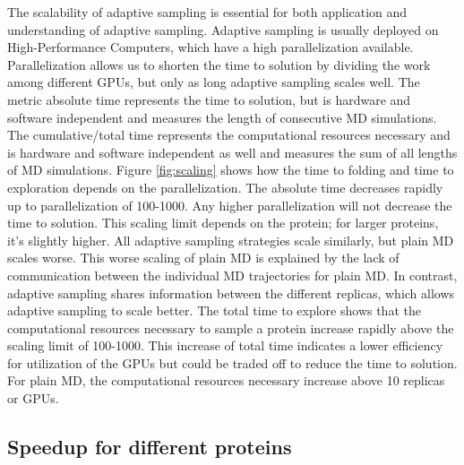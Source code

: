 The scalability of adaptive sampling is essential for both application and understanding of adaptive sampling.  Adaptive sampling is usually deployed on High-Performance Computers, which have a high parallelization available. Parallelization allows us to shorten the time to solution by dividing the work among different GPUs, but only as long adaptive sampling scales well.
The metric absolute time represents the time to solution, but is hardware and software independent and measures the length of consecutive MD simulations. The cumulative/total time represents the computational resources necessary and is hardware and software independent as well and measures the sum of all lengths of MD simulations.
Figure \ref{fig:scaling} shows how the time to folding and time to exploration depends on the parallelization. The absolute time decreases rapidly up to parallelization of 100-1000. Any higher parallelization will not decrease the time to solution. This scaling limit depends on the protein; for larger proteins, it's slightly higher. All adaptive sampling strategies scale similarly, but plain MD scales worse. This worse scaling of plain MD is explained by the lack of communication between the individual MD trajectories for plain MD. In contrast, adaptive sampling shares information between the different replicas, which allows adaptive sampling to scale better. The total time to explore shows that the computational resources necessary to sample a protein increase rapidly above the scaling limit of 100-1000. This increase of total time indicates a lower efficiency for utilization of the GPUs but could be traded off to reduce the time to solution. For plain MD, the computational resources necessary increase above 10 replicas or GPUs.



\subsection{\label{sec:compare}Speedup for different proteins}



